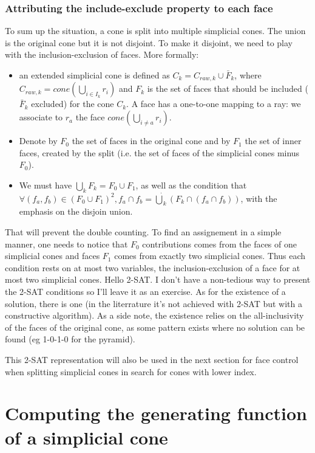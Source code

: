 \documentclass[14pt]{article}
\begin{document}
\subsubsection*{Attributing the include-exclude property to each face}
To sum up the situation, a cone is split into multiple simplicial cones. The union is the original cone but it is not disjoint. To make it disjoint, we need to play with the inclusion-exclusion of faces.
More formally:
\begin{itemize}
  \item an extended simplicial cone is defined as  $C_k = C_{raw,k} \cup \bar F_k$, where $C_{raw,k} = cone\left(\bigcup_{i \in I_k}{r_i}\right)$ and $F_k$ is the set of faces that should be included ($\bar F_k$ excluded) for the cone $C_k$. A face has a one-to-one mapping to a ray: we associate to $r_a$ the face $cone(\bigcup_{i\neq a} r_i)$.
\item Denote by $F_0$ the set of faces in the original cone and by $F_1$ the set of inner faces, created by the split (i.e. the set of faces of the simplicial cones minus $F_0$).
\item We must have $\bigcup_{k} F_k = F_0 \cup F_1$, as well as the condition that $\forall (f_a, f_b) \in (F_0 \cup F_1)^2, f_a \cap f_b = \dot\bigcup_k \left(F_k  \cap (f_a \cap f_b)\right)$, with the emphasis on the disjoin union.
\end{itemize}

That will prevent the double counting. To find an assignement in a simple manner, one needs to notice that $F_0$ contributions comes from the faces of one simplicial cones and faces $F_1$ comes from exactly two simplicial cones. Thus each condition rests on at most two variables, the inclusion-exclusion of a face for at most two simplicial cones. Hello 2-SAT.
I don't have a non-tedious way to present the 2-SAT conditions so I'll leave it as an exercise.
As for the existence of a solution, there is one (in the literrature it's not achieved with 2-SAT but with a constructive algorithm). As a side note, the existence relies on the all-inclusivity of the faces of the original cone, as some pattern exists where no solution can be found (eg 1-0-1-0 for the pyramid).

This 2-SAT representation will also be used in the next section for face control when splitting simplicial cones in search for cones with lower index.





\section*{Computing the generating function of a simplicial cone}
\end{document}
